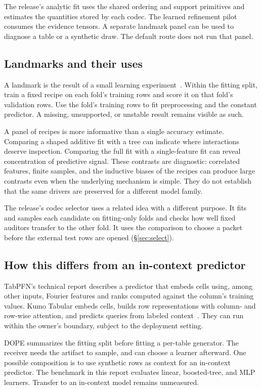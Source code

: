 The release's analytic fit uses the shared ordering and support primitives and estimates the quantities stored by each codec. The learned refinement pilot consumes the evidence tensors. A separate landmark panel can be used to diagnose a table or a synthetic draw. The default  route does not run that panel.

\subsection{Landmarks and their uses}

A landmark is the result of a small learning experiment~\citep{pfahringer2000landmarking}. Within the fitting split, train a fixed recipe on each fold's training rows and score it on that fold's validation rows. Use the fold's training rows to fit preprocessing and the constant predictor. A missing, unsupported, or unstable result remains visible as such.

A panel of recipes is more informative than a single accuracy estimate. Comparing a shaped additive fit with a tree can indicate where interactions deserve inspection. Comparing the full fit with a single-feature fit can reveal concentration of predictive signal. These contrasts are diagnostic: correlated features, finite samples, and the inductive biases of the recipes can produce large contrasts even when the underlying mechanism is simple. They do not establish that the same drivers are preserved for a different model family.

The release's codec selector uses a related idea with a different purpose. It fits and samples each candidate on fitting-only folds and checks how well fixed auditors transfer to the other fold. It uses the comparison to choose a packet before the external test rows are opened (\S\ref{sec:select}).

\subsection{How this differs from an in-context predictor}

TabPFN's technical report describes a predictor that embeds cells using, among other inputs, Fourier features and ranks computed against the column's training values. Kumo Tabular embeds cells, builds row representations with column- and row-wise attention, and predicts queries from labeled context~\citep{priorlabs2026tabpfn,nvidia2026kumotabular}. They can run within the owner's boundary, subject to the deployment setting.

DOPE summarizes the fitting split before fitting a per-table generator. The receiver needs the artifact to sample, and can choose a learner afterward. One possible composition is to use synthetic rows as context for an in-context predictor. The benchmark in this report evaluates linear, boosted-tree, and MLP learners. Transfer to an in-context model remains unmeasured.
